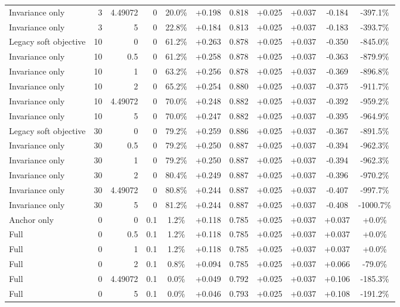 \begin{table}[htbp]
\begin{tabular}{lrrrccccccc}
Invariance only & 3 & 4.49072 & 0 & 20.0\% & +0.198 & 0.818 & +0.025 & +0.037 & -0.184 & -397.1\% \\
Invariance only & 3 & 5 & 0 & 22.8\% & +0.184 & 0.813 & +0.025 & +0.037 & -0.183 & -393.7\% \\
Legacy soft objective & 10 & 0 & 0 & 61.2\% & +0.263 & 0.878 & +0.025 & +0.037 & -0.350 & -845.0\% \\
Invariance only & 10 & 0.5 & 0 & 61.2\% & +0.258 & 0.878 & +0.025 & +0.037 & -0.363 & -879.9\% \\
Invariance only & 10 & 1 & 0 & 63.2\% & +0.256 & 0.878 & +0.025 & +0.037 & -0.369 & -896.8\% \\
Invariance only & 10 & 2 & 0 & 65.2\% & +0.254 & 0.880 & +0.025 & +0.037 & -0.375 & -911.7\% \\
Invariance only & 10 & 4.49072 & 0 & 70.0\% & +0.248 & 0.882 & +0.025 & +0.037 & -0.392 & -959.2\% \\
Invariance only & 10 & 5 & 0 & 70.0\% & +0.247 & 0.882 & +0.025 & +0.037 & -0.395 & -964.9\% \\
Legacy soft objective & 30 & 0 & 0 & 79.2\% & +0.259 & 0.886 & +0.025 & +0.037 & -0.367 & -891.5\% \\
Invariance only & 30 & 0.5 & 0 & 79.2\% & +0.250 & 0.887 & +0.025 & +0.037 & -0.394 & -962.3\% \\
Invariance only & 30 & 1 & 0 & 79.2\% & +0.250 & 0.887 & +0.025 & +0.037 & -0.394 & -962.3\% \\
Invariance only & 30 & 2 & 0 & 80.4\% & +0.249 & 0.887 & +0.025 & +0.037 & -0.396 & -970.2\% \\
Invariance only & 30 & 4.49072 & 0 & 80.8\% & +0.244 & 0.887 & +0.025 & +0.037 & -0.407 & -997.7\% \\
Invariance only & 30 & 5 & 0 & 81.2\% & +0.244 & 0.887 & +0.025 & +0.037 & -0.408 & -1000.7\% \\
Anchor only & 0 & 0 & 0.1 & 1.2\% & +0.118 & 0.785 & +0.025 & +0.037 & +0.037 & +0.0\% \\
Full & 0 & 0.5 & 0.1 & 1.2\% & +0.118 & 0.785 & +0.025 & +0.037 & +0.037 & +0.0\% \\
Full & 0 & 1 & 0.1 & 1.2\% & +0.118 & 0.785 & +0.025 & +0.037 & +0.037 & +0.0\% \\
Full & 0 & 2 & 0.1 & 0.8\% & +0.094 & 0.785 & +0.025 & +0.037 & +0.066 & -79.0\% \\
Full & 0 & 4.49072 & 0.1 & 0.0\% & +0.049 & 0.792 & +0.025 & +0.037 & +0.106 & -185.3\% \\
Full & 0 & 5 & 0.1 & 0.0\% & +0.046 & 0.793 & +0.025 & +0.037 & +0.108 & -191.2\% \\

\end{tabular}
\end{table}
